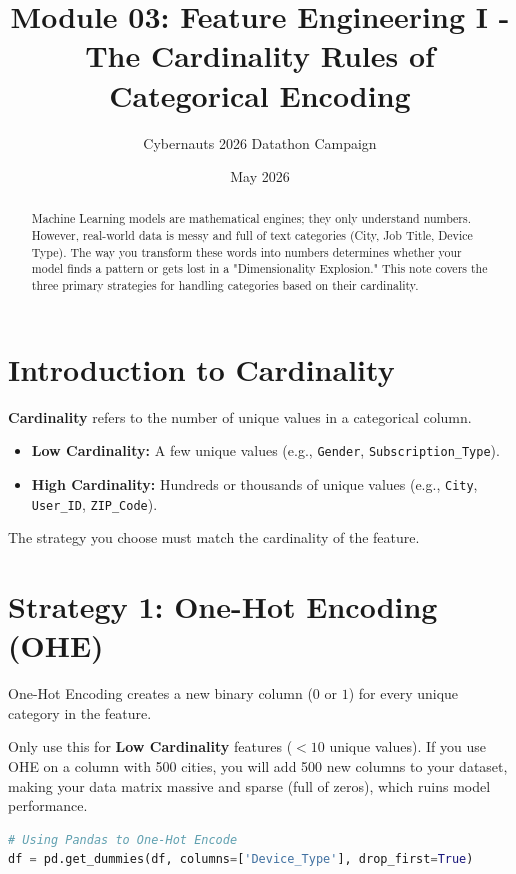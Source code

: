 \documentclass{article}
\title{Module 03: Feature Engineering I - The Cardinality Rules of Categorical Encoding}
\author{Cybernauts 2026 Datathon Campaign}
\date{May 2026}
\begin{document}
\maketitle

\begin{abstract}
Machine Learning models are mathematical engines; they only understand numbers. However, real-world data is messy and full of text categories (City, Job Title, Device Type). The way you transform these words into numbers determines whether your model finds a pattern or gets lost in a "Dimensionality Explosion." This note covers the three primary strategies for handling categories based on their cardinality.
\end{abstract}

\tableofcontents
\newpage

\section{Introduction to Cardinality}
\textbf{Cardinality} refers to the number of unique values in a categorical column. 
\begin{itemize}
    \item \textbf{Low Cardinality:} A few unique values (e.g., \texttt{Gender}, \texttt{Subscription\_Type}).
    \item \textbf{High Cardinality:} Hundreds or thousands of unique values (e.g., \texttt{City}, \texttt{User\_ID}, \texttt{ZIP\_Code}).
\end{itemize}
The strategy you choose must match the cardinality of the feature.

\section{Strategy 1: One-Hot Encoding (OHE)}
One-Hot Encoding creates a new binary column ($0$ or $1$) for every unique category in the feature.

\begin{tcolorbox}[colback=blue!5!white,colframe=blue!75!black,title=When to use OHE]
Only use this for \textbf{Low Cardinality} features ($< 10$ unique values). If you use OHE on a column with 500 cities, you will add 500 new columns to your dataset, making your data matrix massive and sparse (full of zeros), which ruins model performance.
\end{tcolorbox}

\begin{lstlisting}[language=Python]
# Using Pandas to One-Hot Encode
df = pd.get_dummies(df, columns=['Device_Type'], drop_first=True)
\end{lstlisting}
\end{document}
